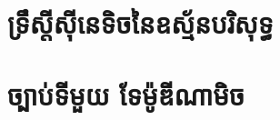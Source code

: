 \documentclass[12pt,a4paper]{classes/fancy}
\begin{document}
    \frontmatter{}
    \tableofcontents
    \mainmatter{}
    \chapter{ទ្រឹស្តីស៊ីនេទិចនៃឧស្ម័នបរិសុទ្ធ}
    \chapter{ច្បាប់ទីមួយ ទែម៉ូឌីណាមិច}
    
    
    
    
\end{document}
